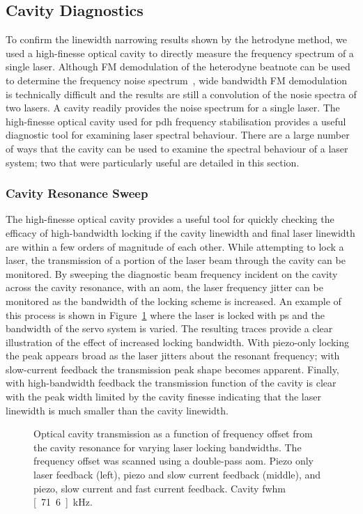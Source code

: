 \subsection{Cavity Diagnostics}

To confirm the linewidth narrowing results shown by the hetrodyne method, we used a high-finesse optical cavity to directly measure the frequency spectrum of a single laser.
Although FM demodulation of the heterodyne beatnote can be used to determine the frequency noise spectrum~\cite{turner_frequency_2002}, wide bandwidth FM demodulation is technically difficult and the results are still a convolution of the nosie spectra of two lasers.
A cavity readily provides the noise spectrum for a single laser.
The high-finesse optical cavity used for \gls{pdh} frequency stabilisation provides a useful diagnostic tool for examining laser spectral behaviour.
There are a large number of ways that the cavity can be used to examine the spectral behaviour of a laser system; two that were particularly useful are detailed in this section.

\subsubsection{Cavity Resonance Sweep}

The high-finesse optical cavity provides a useful tool for quickly checking the efficacy of high-bandwidth locking if the cavity linewidth and final laser linewidth are within a few orders of magnitude of each other.
While attempting to lock a laser, the transmission of a portion of the laser beam through the cavity can be monitored.
By sweeping the diagnostic beam frequency incident on the cavity across the cavity resonance, with an \gls{aom}, the laser frequency jitter can be monitored as the bandwidth of the locking scheme is increased.
An example of this process is shown in Figure~\ref{figure:cavity_scans} where the laser is locked with \gls{ps} and the bandwidth of the servo system is varied.
The resulting traces provide a clear illustration of the effect of increased locking bandwidth.
With piezo-only locking the peak appears broad as the laser jitters about the resonant frequency; with slow-current feedback the transmission peak shape becomes apparent.
Finally, with high-bandwidth feedback the transmission function of the cavity is clear with the peak width limited by the cavity finesse indicating that the laser linewidth is much smaller than the cavity linewidth.

\begin{figure}
\center

\caption[Optical cavity transmission demonstrating laser frequency lock bandwidths.]{Optical cavity transmission as a function of frequency offset from the cavity resonance for varying laser locking bandwidths. The frequency offset was scanned using a double-pass \gls{aom}. Piezo only laser feedback (left), piezo and slow current feedback (middle), and piezo, slow current and fast current feedback. Cavity \gls{fwhm} \unit[71.6]{kHz}.}
\label{figure:cavity_scans}
\end{figure}

